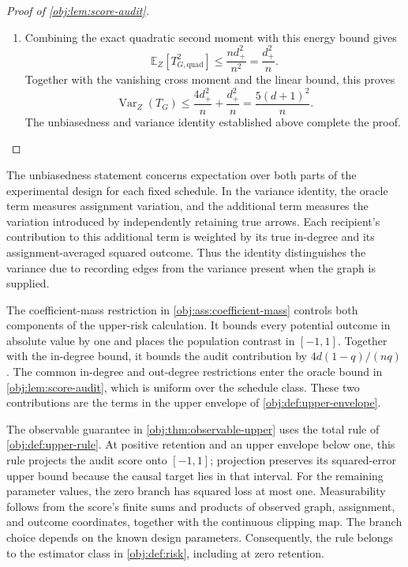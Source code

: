 \documentclass[11pt]{article}
\begin{document}
\begin{proof}[Proof of \cref{obj:lem:score-audit}]
\begin{enumerate}
\item Combining the exact quadratic second moment with this energy bound gives
\[
\mathbb E_Z[T_{G,\mathrm{quad}}^2]
\le\frac{nd_+^2}{n^2}
=\frac{d_+^2}{n}.
\]
Together with the vanishing cross moment and the linear bound, this proves
\[
\operatorname{Var}_Z(T_G)
\le\frac{4d_+^2}{n}+\frac{d_+^2}{n}
=\frac{5(d+1)^2}{n}.
\]
The unbiasedness and variance identity established above complete the proof.
\end{enumerate}
\end{proof}

The unbiasedness statement concerns expectation over both parts of the experimental design for each fixed schedule. In the variance identity, the oracle term measures assignment variation, and the additional term measures the variation introduced by independently retaining true arrows. Each recipient's contribution to this additional term is weighted by its true in-degree and its assignment-averaged squared outcome. Thus the identity distinguishes the variance due to recording edges from the variance present when the graph is supplied.

The coefficient-mass restriction in \cref{obj:ass:coefficient-mass} controls both components of the upper-risk calculation. It bounds every potential outcome in absolute value by one and places the population contrast in \([-1,1]\). Together with the in-degree bound, it bounds the audit contribution by \(4d(1-q)/(nq)\). The common in-degree and out-degree restrictions enter the oracle bound in \cref{obj:lem:score-audit}, which is uniform over the schedule class. These two contributions are the terms in the upper envelope of \cref{obj:def:upper-envelope}.

The observable guarantee in \cref{obj:thm:observable-upper} uses the total rule of \cref{obj:def:upper-rule}. At positive retention and an upper envelope below one, this rule projects the audit score onto \([-1,1]\); projection preserves its squared-error upper bound because the causal target lies in that interval. For the remaining parameter values, the zero branch has squared loss at most one. Measurability follows from the score's finite sums and products of observed graph, assignment, and outcome coordinates, together with the continuous clipping map. The branch choice depends on the known design parameters. Consequently, the rule belongs to the estimator class in \cref{obj:def:risk}, including at zero retention.
\end{document}
